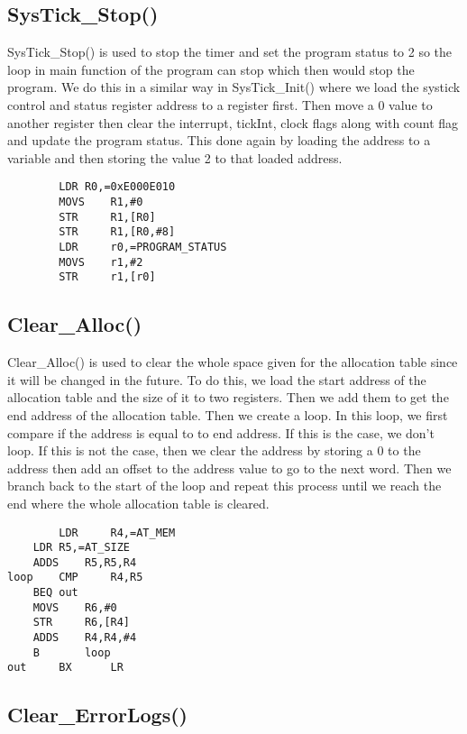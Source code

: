 \documentclass[pdftex,12pt,a4paper]{article}
\begin{document}
\subsection{SysTick\_Stop()}

SysTick\_Stop() is used to stop the timer and set the program status to 2 so the loop in main function of the program can stop which then would stop the program. We do this in a similar way in SysTick\_Init() where we load the systick control and status register address to a register first. Then move a 0 value to another register then clear the interrupt, tickInt, clock flags along with count flag and update the program status. This done again by loading the address to a variable and then storing the value 2 to that loaded address. 

\begin{lstlisting}
        LDR	R0,=0xE000E010 				
        MOVS    R1,#0							
        STR     R1,[R0]						
        STR     R1,[R0,#8]					
        LDR     r0,=PROGRAM_STATUS				
        MOVS    r1,#2							
        STR     r1,[r0]							
\end{lstlisting}
\subsection{Clear\_Alloc()}

Clear\_Alloc() is used to clear the whole space given for the allocation table since it will be changed in the future. To do this, we load the start address of the allocation table and the size of it to two registers. Then we add them to get the end address of the allocation table. Then we create a loop. In this loop, we first compare if the address is equal to to end address. If this is the case, we don't loop. If this is not the case, then we clear the address by storing a 0 to the address then add an offset to the address value to go to the next word. Then we branch back to the start of the loop and repeat this process until we reach the end where the whole allocation table is cleared.

\begin{lstlisting}
        LDR     R4,=AT_MEM						
	LDR	R5,=AT_SIZE							
	ADDS    R5,R5,R4							
loop	CMP     R4,R5							
	BEQ	out								
	MOVS    R6,#0								
	STR     R6,[R4]							
	ADDS    R4,R4,#4						
	B       loop	
out     BX      LR
\end{lstlisting}

\subsection{Clear\_ErrorLogs()}
\end{document}
